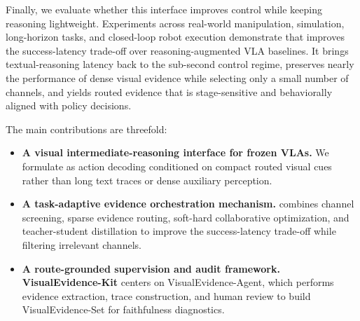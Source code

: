 Finally, we evaluate whether this interface improves control while keeping reasoning lightweight. Experiments across real-world manipulation, simulation, long-horizon tasks, and closed-loop robot execution demonstrate that \method{} improves the success-latency trade-off over reasoning-augmented VLA baselines. It brings textual-reasoning latency back to the sub-second control regime, preserves nearly the performance of dense visual evidence while selecting only a small number of channels, and yields routed evidence that is stage-sensitive and behaviorally aligned with policy decisions.

The main contributions are threefold:
\begin{itemize}[itemsep=0mm,leftmargin=4mm]
    \item \textbf{A visual intermediate-reasoning interface for frozen VLAs.} We formulate \thinkimg{} as action decoding conditioned on compact routed visual cues rather than long text traces or dense auxiliary perception.
    \item \textbf{A task-adaptive evidence orchestration mechanism.} \method{} combines channel screening, sparse evidence routing, soft-hard collaborative optimization, and teacher-student distillation to improve the success-latency trade-off while filtering irrelevant channels.
    \item \textbf{A route-grounded supervision and audit framework.} \textbf{VisualEvidence-Kit} centers on VisualEvidence-Agent, which performs evidence extraction, trace construction, and human review to build VisualEvidence-Set for faithfulness diagnostics.
\end{itemize}

